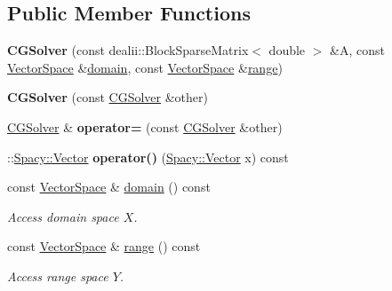 \subsection*{\-Public \-Member \-Functions}
\begin{DoxyCompactItemize}
\item 
\hypertarget{classSpacy_1_1dealII_1_1CGSolver_a7413b046f07ae75dd59eea480a944cc7}{{\bfseries \-C\-G\-Solver} (const dealii\-::\-Block\-Sparse\-Matrix$<$ double $>$ \&\-A, const \hyperlink{classSpacy_1_1VectorSpace}{\-Vector\-Space} \&\hyperlink{classSpacy_1_1OperatorBase_a2588f9b3e0188820c4c494e63293dc6f}{domain}, const \hyperlink{classSpacy_1_1VectorSpace}{\-Vector\-Space} \&\hyperlink{classSpacy_1_1OperatorBase_ab19d3b7a6f290b1079248f1e567e53d6}{range})}\label{classSpacy_1_1dealII_1_1CGSolver_a7413b046f07ae75dd59eea480a944cc7}

\item 
\hypertarget{classSpacy_1_1dealII_1_1CGSolver_ad9b75390b2b2deeda4e2372c48739ba1}{{\bfseries \-C\-G\-Solver} (const \hyperlink{classSpacy_1_1dealII_1_1CGSolver}{\-C\-G\-Solver} \&other)}\label{classSpacy_1_1dealII_1_1CGSolver_ad9b75390b2b2deeda4e2372c48739ba1}

\item 
\hypertarget{classSpacy_1_1dealII_1_1CGSolver_ad66678932354cb523292c90bb9148464}{\hyperlink{classSpacy_1_1dealII_1_1CGSolver}{\-C\-G\-Solver} \& {\bfseries operator=} (const \hyperlink{classSpacy_1_1dealII_1_1CGSolver}{\-C\-G\-Solver} \&other)}\label{classSpacy_1_1dealII_1_1CGSolver_ad66678932354cb523292c90bb9148464}

\item 
\hypertarget{classSpacy_1_1dealII_1_1CGSolver_ae36d85194fbd49f5658eccfada2c3214}{\-::\hyperlink{classSpacy_1_1Vector}{\-Spacy\-::\-Vector} {\bfseries operator()} (\hyperlink{classSpacy_1_1Vector}{\-Spacy\-::\-Vector} x) const }\label{classSpacy_1_1dealII_1_1CGSolver_ae36d85194fbd49f5658eccfada2c3214}

\item 
\hypertarget{classSpacy_1_1OperatorBase_a2588f9b3e0188820c4c494e63293dc6f}{const \hyperlink{classSpacy_1_1VectorSpace}{\-Vector\-Space} \& \hyperlink{classSpacy_1_1OperatorBase_a2588f9b3e0188820c4c494e63293dc6f}{domain} () const }\label{classSpacy_1_1OperatorBase_a2588f9b3e0188820c4c494e63293dc6f}

\begin{DoxyCompactList}\small\item\em \-Access domain space $X$. \end{DoxyCompactList}\item 
\hypertarget{classSpacy_1_1OperatorBase_ab19d3b7a6f290b1079248f1e567e53d6}{const \hyperlink{classSpacy_1_1VectorSpace}{\-Vector\-Space} \& \hyperlink{classSpacy_1_1OperatorBase_ab19d3b7a6f290b1079248f1e567e53d6}{range} () const }\label{classSpacy_1_1OperatorBase_ab19d3b7a6f290b1079248f1e567e53d6}

\begin{DoxyCompactList}\small\item\em \-Access range space $Y$. \end{DoxyCompactList}\end{DoxyCompactItemize}
